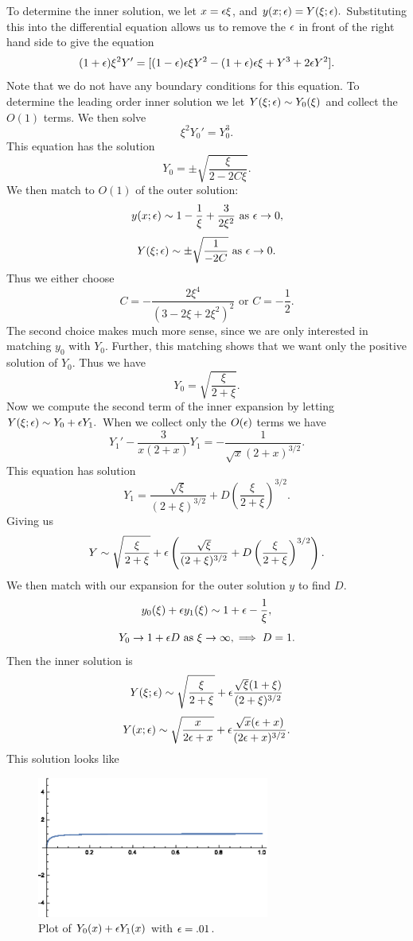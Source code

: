 \item To determine the inner solution, we let $x=\epsilon\xi$, and $y(x;\epsilon)=Y(\xi;\epsilon).$ Substituting this into the differential equation allows us to remove the $\epsilon$ in front of the right hand side to give the equation
    $$(1+\epsilon)\xi^2 Y'=[(1-\epsilon)\epsilon\xi Y^2-(1+\epsilon)\epsilon\xi+Y^3+2\epsilon Y^2].$$
    Note that we do not have any boundary conditions for this equation. To determine the leading order inner solution we let $Y(\xi;\epsilon)\sim Y_0(\xi)$ and collect the $O(1)$ terms. We then solve
    $$\xi^2 Y_0'=Y_0^3.$$
    This equation has the solution
    $$Y_0=\pm\sqrt{\frac{\xi}{2-2C\xi}}.$$
    We then match to $O(1)$ of the outer solution:
    $$y(x;\epsilon)\sim 1-\frac{1}{\xi}+\frac{3}{2\xi^2}\text{ as }\epsilon\to 0,$$
    $$Y(\xi;\epsilon)\sim \pm\sqrt{\frac{1}{-2C}}\text{ as }\epsilon\to 0.$$
    Thus we either choose 
    $$C=-\frac{2\xi^4}{(3-2\xi+2\xi^2)^2}\text{ or }C=-\frac{1}{2}.$$
    The second choice makes much more sense, since we are only interested in matching $y_0$ with $Y_0.$ Further, this matching shows that we want only the positive solution of $Y_0.$  Thus we have
    $$Y_0=\sqrt{\frac{\xi}{2+\xi}}.$$
    Now we compute the second term of the inner expansion by letting $Y(\xi;\epsilon)\sim Y_0+\epsilon Y_1.$ When we collect only the $O(\epsilon)$ terms we have
    $$Y_1'-\frac{3}{x(2+x)}Y_1=-\frac{1}{\sqrt{x}(2+x)^{3/2}}.$$
    This equation has solution
    $$Y_1=\frac{\sqrt{\xi}}{(2+\xi)^{3/2}}+D\left(\frac{\xi}{2+\xi}\right)^{3/2}.$$
    Giving us 
    $$Y\sim \sqrt{\frac{\xi}{2+\xi}}+\epsilon\left(\frac{\sqrt{\xi}}{(2+\xi)^{3/2}}+D\left(\frac{\xi}{2+\xi}\right)^{3/2}\right).$$
    We then match with our expansion for the outer solution $y$ to find $D$.
    $$y_0(\xi)+\epsilon y_1(\xi)\sim 1+\epsilon-\frac{1}{\xi},$$
    $$Y_0\to 1+\epsilon D\text{ as }\xi\to \infty, \implies D=1.$$
    Then the inner solution is
    $$Y(\xi;\epsilon)\sim \sqrt{\frac{\xi}{2+\xi}}+\epsilon\frac{\sqrt{\xi}(1+\xi)}{(2+\xi)^{3/2}}$$
    $$Y(x;\epsilon)\sim \sqrt{\frac{x}{2\epsilon+x}}+\epsilon\frac{\sqrt{x}(\epsilon+x)}{(2\epsilon+x)^{3/2}}.$$
    This solution looks like
    \begin{figure}[h]
    \centering
    \includegraphics[width=3in]{test1no3prtc}
    \caption{Plot of $Y_0(x)+\epsilon Y_1(x)$ with $\epsilon=.01$.}
    \end{figure}

